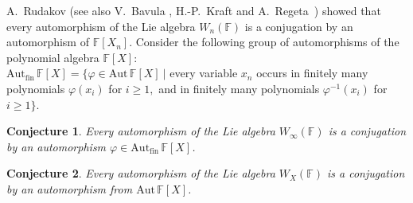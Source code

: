 \documentclass[12pt,a4paper]{amsart}
\theoremstyle{plain}
\newtheorem{Conjecture}{Conjecture}
\begin{document}
	
	
	
	A.~Rudakov \cite{Rudakov1} (see also V.~Bavula \cite{Bavula,Bavula2,Bavula3}, H.-P.~Kraft and A.~Re\-ge\-ta~\cite{Kraft}) showed that every automorphism of the Lie algebra $W_{n}(\mathbb{F})$ is a conjugation by an automorphism of $\mathbb{F}[X_n]$. Consider the following group of automorphisms of the polynomial algebra $\mathbb{F}[X]$: \\
	$\mathrm{Aut}_{\mathrm{fin}}\, \mathbb{F}[X] = \big\{ \varphi \in \mathrm{Aut}\, \mathbb{F}[X] \  \big| $   every variable $x_n $     occurs in finitely many polynomials $\varphi(x_i)$ for $i \geq 1,$   and in finitely many polynomials 	$\varphi^{-1}(x_i)$ for $ i \geq 1 \}.$

	
\begin{Conjecture} Every automorphism of the Lie algebra $W_{\infty}(\mathbb{F})$ is a conjugation by an automorphism $\varphi \in \mathrm{Aut}_{\mathrm{fin}}\, \mathbb{F}[X]$. \end{Conjecture}
	

\begin{Conjecture}  Every automorphism of the Lie algebra $W_{X}(\mathbb{F})$ is a conjugation by an automorphism from $\mathrm{Aut}\, \mathbb{F}[X]$. \end{Conjecture}

	
	
\end{document}

